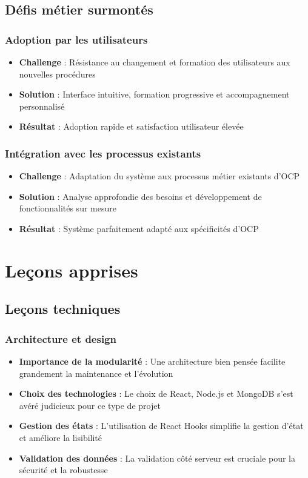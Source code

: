 \subsection{Défis métier surmontés}
\subsubsection{Adoption par les utilisateurs}
\begin{itemize}
    \item \textbf{Challenge} : Résistance au changement et formation des utilisateurs aux nouvelles procédures
    \item \textbf{Solution} : Interface intuitive, formation progressive et accompagnement personnalisé
    \item \textbf{Résultat} : Adoption rapide et satisfaction utilisateur élevée
\end{itemize}

\subsubsection{Intégration avec les processus existants}
\begin{itemize}
    \item \textbf{Challenge} : Adaptation du système aux processus métier existants d'OCP
    \item \textbf{Solution} : Analyse approfondie des besoins et développement de fonctionnalités sur mesure
    \item \textbf{Résultat} : Système parfaitement adapté aux spécificités d'OCP
\end{itemize}

\section{Leçons apprises}
\subsection{Leçons techniques}
\subsubsection{Architecture et design}
\begin{itemize}
    \item \textbf{Importance de la modularité} : Une architecture bien pensée facilite grandement la maintenance et l'évolution
    \item \textbf{Choix des technologies} : Le choix de React, Node.js et MongoDB s'est avéré judicieux pour ce type de projet
    \item \textbf{Gestion des états} : L'utilisation de React Hooks simplifie la gestion d'état et améliore la lisibilité
    \item \textbf{Validation des données} : La validation côté serveur est cruciale pour la sécurité et la robustesse
\end{itemize}

